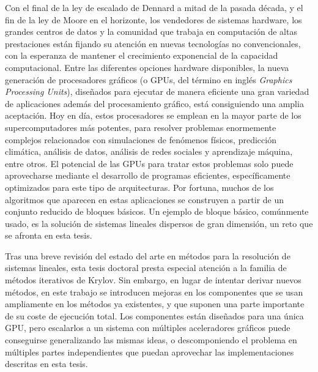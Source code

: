 Con el final de la ley de escalado de Dennard a mitad de la pasada década, y el
fin de la ley de Moore en el horizonte, los vendedores de sistemas hardware, los
grandes centros de datos y la comunidad que trabaja en computación de altas
prestaciones están fijando su atención en nuevas tecnologías no convencionales,
con la esperanza de mantener el crecimiento exponencial de la capacidad
computacional. Entre las diferentes opciones hardware disponibles, la nueva
generación de procesadores gráficos (o GPUs, del término en inglés
\textit{Graphics Processing Units}), diseñados para ejecutar de manera eficiente
una gran variedad de aplicaciones además del procesamiento gráfico, está
consiguiendo una amplia aceptación.  Hoy en día, estos procesadores se emplean
en la mayor parte de los supercomputadores más potentes, para resolver problemas
enormemente complejos relacionados con simulaciones de fenómenos físicos,
predicción climática, análisis de datos, análisis de redes sociales y
aprendizaje máquina, entre otros. El potencial de las GPUs para tratar estos
problemas solo puede aprovecharse mediante el desarrollo de programas
eficientes, específicamente optimizados para este tipo de arquitecturas. Por
fortuna, muchos de los algoritmos que aparecen en estas aplicaciones se
construyen a partir de un conjunto reducido de bloques básicos. Un ejemplo de
bloque básico, comúnmente usado, es la solución de sistemas lineales dispersos
de gran dimensión, un reto que se afronta en esta tesis.

Tras una breve revisión del estado del arte en métodos para la resolución de
sistemas lineales, esta tesis doctoral presta especial atención a la familia de
métodos iterativos de Krylov.  Sin embargo, en lugar de intentar derivar nuevos
métodos, en este trabajo se introducen mejoras en los componentes que se usan
ampliamente en los métodos ya existentes, y que suponen una parte importante de
su coste de ejecución total. Los componentes están diseñados para una única GPU,
pero escalarlos a un sistema con múltiples aceleradores gráficos puede
conseguirse generalizando las mismas ideas, o descomponiendo el problema en
múltiples partes independientes que puedan aprovechar las implementaciones
descritas en esta tesis.

